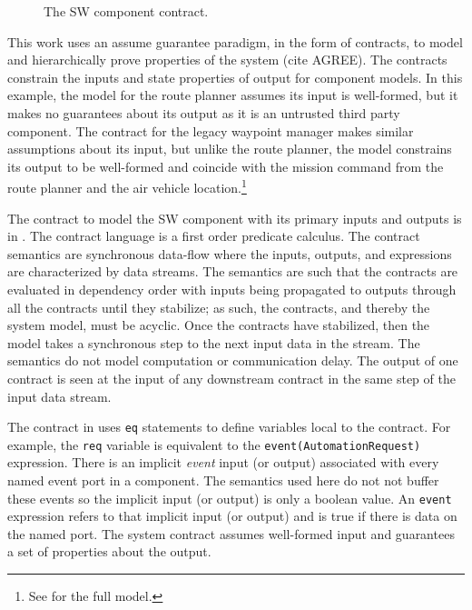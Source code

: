\begin{figure}
  \begin{center}
    \scalebox{0.60}{\usebox{\sw}}
  \end{center}
  \caption{The SW component contract.}
  \label{fig:sw}
\end{figure}

This work uses an assume guarantee paradigm, in the form of contracts, to model and hierarchically prove properties of the system (cite AGREE). The contracts constrain the inputs and state properties of output for component models. In this example, the model for the route planner assumes its input is well-formed, but it makes no guarantees about its output as it is an untrusted third party component. The contract for the legacy waypoint manager makes similar assumptions about its input, but unlike the route planner, the model constrains its output to be well-formed and coincide with the mission command from the route planner and the air vehicle location.\footnote{See \cite{repo} for the full model.}

The contract to model the SW component with its primary inputs and outputs is in . The contract language is a first order predicate calculus. The contract semantics are synchronous data-flow where the inputs, outputs, and expressions are characterized by data streams. The semantics are such that the contracts are evaluated in dependency order with inputs being propagated to outputs through all the contracts until they stabilize; as such, the contracts, and thereby the system model, must be acyclic. Once the contracts have stabilized, then the model takes a synchronous step to the next input data in the stream. The semantics do not model computation or communication delay. The output of one contract is seen at the input of any downstream contract in the same step of the input data stream. 

The contract in  uses \texttt{eq} statements to define variables local to the contract. For example, the \texttt{req} variable is equivalent to the \texttt{event(AutomationRequest)} expression. There is an implicit \emph{event} input (or output) associated with every named event port in a component. The semantics used here do not not buffer these events so the implicit input (or output) is only a boolean value. An \texttt{event} expression refers to that implicit input (or output) and is true if there is data on the named port. The system contract assumes well-formed input and guarantees a set of properties about the output.

